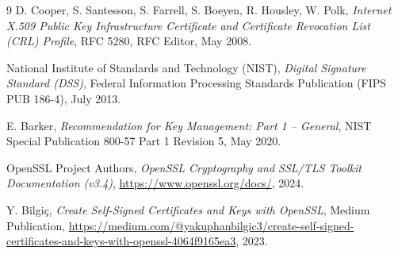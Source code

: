 \documentclass[12pt,a4paper]{article}
\begin{document}
\begin{thebibliography}{9}
D. Cooper, S. Santesson, S. Farrell, S. Boeyen, R. Housley, W. Polk,
\textit{Internet X.509 Public Key Infrastructure Certificate and Certificate Revocation List (CRL) Profile},
RFC 5280, RFC Editor, May 2008.

National Institute of Standards and Technology (NIST),
\textit{Digital Signature Standard (DSS)},
Federal Information Processing Standards Publication (FIPS PUB 186-4), July 2013.

E. Barker,
\textit{Recommendation for Key Management: Part 1 -- General},
NIST Special Publication 800-57 Part 1 Revision 5, May 2020.

OpenSSL Project Authors,
\textit{OpenSSL Cryptography and SSL/TLS Toolkit Documentation (v3.4)},
\url{https://www.openssl.org/docs/}, 2024.

Y. Bilgiç,
\textit{Create Self-Signed Certificates and Keys with OpenSSL},
Medium Publication,
\url{https://medium.com/@yakuphanbilgic3/create-self-signed-certificates-and-keys-with-openssl-4064f9165ea3}, 2023.
\end{thebibliography}
\end{document}
